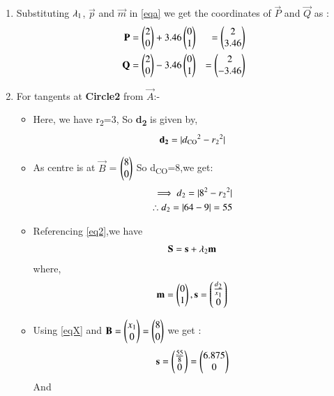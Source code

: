 \documentclass[journal,12pt,twocolumn]{IEEEtran}
\begin{document}
\begin{enumerate}
\item Substituting $\lambda\textsubscript{1}$, $\vec{p}$ and $\vec{m}$ in \eqref{eqa} we get the coordinates of $\vec{P}$ and  $\vec{Q}$ as :
\begin{align}
\vec{P}&=\myvec{2\\0}+ 3.46\myvec{0\\1}&=\myvec{2\\3.46}
\\
\vec{Q}&=\myvec{2\\0}- 3.46\myvec{0\\1}&=\myvec{2\\-3.46}
\end{align}
\item For tangents at \textbf{Circle2} from $\vec{A}$:-
\begin{itemize}
\item Here, we have r\textsubscript{2}=3, So \textbf{d\textsubscript{2}} is given by,
\begin{align}
 \textbf{d\textsubscript{2}} = \abs{d\textsubscript{CO}^2-r\textsubscript{2}^2}
 \end{align}
\item  As  centre is at $\vec{B}$ = $\myvec{8\\0}$ So d\textsubscript{CO}=8,we get:
\begin{align}
 \implies d\textsubscript{2}=\abs{8^2-r\textsubscript{2}^2} 
 \\
  \therefore  d\textsubscript{2}=\abs{64-9} = 55\label{eqX}
\end{align}
\item Referencing \eqref{eq2},we have
\begin{align}
 \vec{S}=\vec{s}+\lambda\textsubscript{2} \vec{m}   \label{eqb}
\end{align}
where,
\begin{align}
 \vec{m}=\myvec{0\\1},\vec{s}=\myvec{\frac{d\textsubscript{2}}{x\textsubscript{1}}\\0}
 \end{align}
 \item Using \eqref{eqX} and $\vec{B}=\myvec{x\textsubscript{1}\\0}=\myvec{8\\0}$ we get :
 \begin{align}
 \vec{s}=\myvec{\frac{55}{8}\\0}=\myvec{6.875\\0}
\end{align}
And
\begin{align}

\end{align}
\end{itemize}
\end{enumerate}
\end{document}
